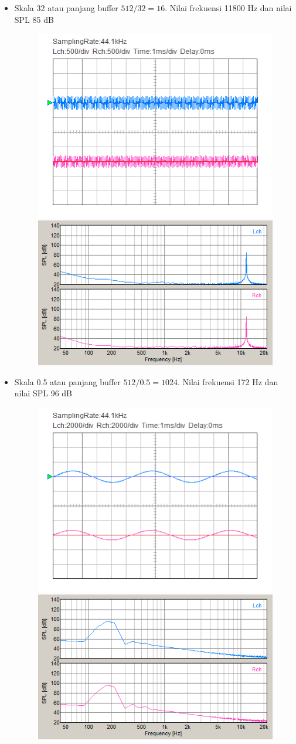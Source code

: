 \documentclass[12pt,]{article}
\begin{document}
\begin{itemize}
  		\item Skala 32 atau panjang buffer $512/32 = 16$.
  		Nilai frekuensi 11800 Hz dan nilai SPL 85 dB
  		\begin{figure}[H]
  			\centering
  			\includegraphics[width=0.45\linewidth]{result/day_4/newsinehighest}
  			\includegraphics[width=0.45\linewidth]{result/day_4/newsinehighestfft}
  		\end{figure}

  		\item Skala 0.5 atau panjang buffer $512/0.5 = 1024$.
  		Nilai frekuensi 172 Hz dan nilai SPL 96 dB
  		\begin{figure}[H]
  			\centering
  			\includegraphics[width=0.45\linewidth]{result/day_4/osi_sine0p5}
  			\includegraphics[width=0.45\linewidth]{result/day_4/fft_sine0p5}
  		\end{figure}


\end{itemize}
\end{document}

